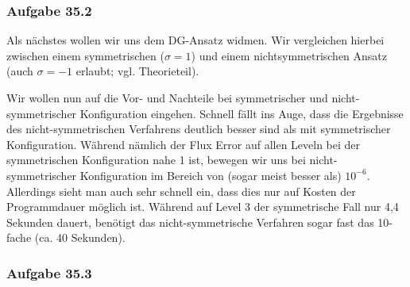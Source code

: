 \subsubsection{Aufgabe 35.2}
Als nächstes wollen wir uns dem DG-Ansatz widmen. Wir vergleichen hierbei  zwischen einem symmetrischen ($ \sigma = 1$) und einem nichtsymmetrischen Ansatz (auch $ \sigma = -1 $ erlaubt; vgl. Theorieteil).

\begin{figure}[H]
	\centering
\end{figure}


\begin{figure}[H]
	\centering
\end{figure}

Wir wollen nun auf die Vor- und Nachteile bei symmetrischer und nicht-symmetrischer Konfiguration eingehen.
Schnell fällt ins Auge, dass die Ergebnisse des nicht-symmetrischen Verfahrens deutlich besser sind als mit symmetrischer Konfiguration. Während nämlich der Flux Error auf allen Leveln bei der symmetrischen Konfiguration nahe 1 ist, bewegen wir uns bei nicht-symmetrischer Konfiguration im Bereich von (sogar meist besser als) $10^{-6}$. Allerdings sieht man auch sehr schnell ein, dass dies nur auf Kosten der Programmdauer möglich ist. Während auf Level 3 der symmetrische Fall nur 4,4 Sekunden dauert, benötigt das nicht-symmetrische Verfahren sogar fast das 10-fache (ca. 40 Sekunden). 

\subsubsection{Aufgabe 35.3}
\begin{figure}[H]
	\centering
\end{figure}

